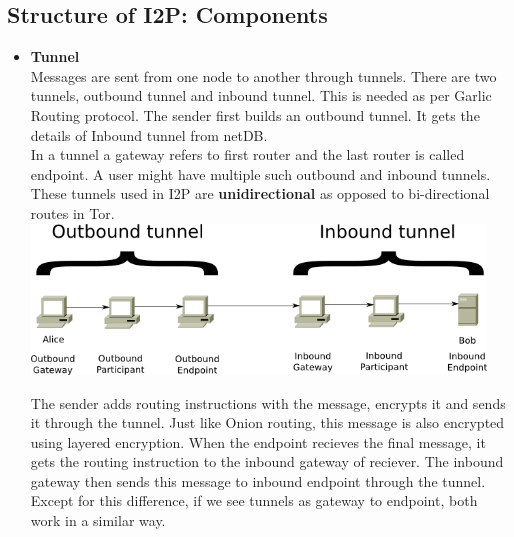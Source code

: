 \documentclass{main}
\begin{document}
\subsection{Structure of I2P: Components}
\begin{itemize}
	\item \textbf{Tunnel} \\
		Messages are sent from one node to another through tunnels. There are two tunnels, outbound tunnel
		and inbound tunnel. This is needed as per Garlic Routing protocol. The sender first builds an 
		outbound tunnel. It gets the details of Inbound tunnel from netDB. \\
		In a tunnel a gateway refers to first router and the last router is called endpoint.
		A user might have multiple such outbound and inbound tunnels. These tunnels
		used in I2P are \textbf{unidirectional} as opposed to bi-directional routes in Tor. \\
		\includegraphics[width=0.95\textwidth]{Resources/images/i2p-tunnels.png}

		The sender adds routing instructions with the message, encrypts it and sends it through the tunnel.
		Just like Onion routing, this message is also encrypted using layered encryption. When the endpoint
		recieves the final message, it gets the routing instruction to the inbound gateway of reciever.
		The inbound gateway then sends this message to inbound endpoint through the tunnel. Except for this 
		difference, if we see tunnels as gateway to endpoint, both work in a similar way.


\end{itemize}
\end{document}
